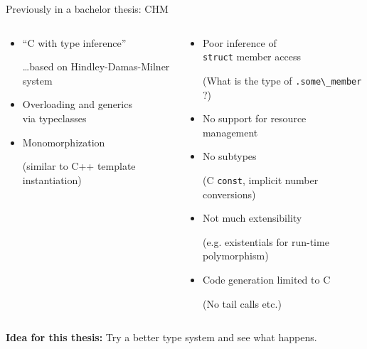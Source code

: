 \documentclass[aspectratio=169]{beamer}
\newcommand{\li}[1]{\lstinline{#1}}
\def\smll{\scriptsize}
\begin{document}
\begin{frame}{Previously in a bachelor thesis: CHM}
\begin{columns}
\begin{column}{.5\linewidth}
  \begin{itemize}\small
  \item[\color{blue!66}\faArrowRight] ``C with type inference'' \\{\smll\dots based on \alert<3>{Hindley-Damas-Milner system}\par}
  \item[\color{blue!66}\faArrowRight] Overloading and generics \\ via typeclasses
  \item[\color{blue!66}\faArrowRight] Monomorphization \\{\smll(similar to C++ template instantiation)\par}
  \end{itemize}
\end{column}\pause
\begin{column}{.5\linewidth}
  \begin{itemize}\small
  \item[\color{red}\faTimes] Poor inference of \\ \texttt{struct} member access \\ {\smll(What is the type of \li{.some\_member} ?)\par}
  \item[\color{red}\faTimes] No support for resource management
  \item[\color{red}\faTimes] No subtypes \\{\smll (C \li{const}, implicit number conversions)\par}
  \item[\color{red}\faTimes] Not much extensibility \\{\smll(e.g. existentials for run-time polymorphism)\par}
  \item[\color{red}\faTimes] Code generation limited to C \\{\smll (No tail calls etc.)\par}
  \end{itemize}
\end{column}
\end{columns}

\vspace{3ex}
\pause\textbf{Idea for this thesis:} Try a \alert{better type system} and see what happens.
\end{frame}
\end{document}
